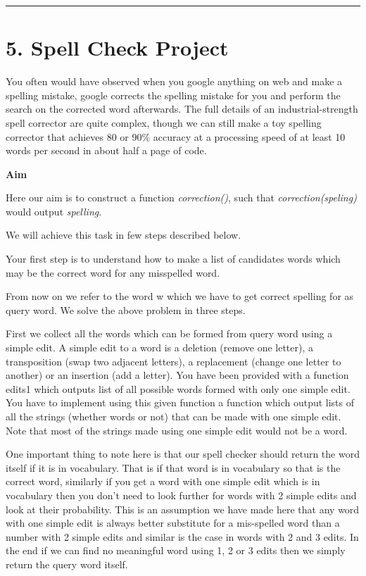 \documentclass[11pt]{article}
\begin{document}
    \begin{center}\rule{0.5\linewidth}{\linethickness}\end{center}

    \hypertarget{spell-check-project}{%
\section{5. Spell Check Project}\label{spell-check-project}}

    You often would have observed when you google anything on web and make a
spelling mistake, google corrects the spelling mistake for you and
perform the search on the corrected word afterwards. The full details of
an industrial-strength spell corrector are quite complex, though we can
still make a toy spelling corrector that achieves 80 or 90\% accuracy at
a processing speed of at least 10 words per second in about half a page
of code.

\textbf{Aim}

Here our aim is to construct a function \emph{correction()}, such that
\emph{correction(speling)} would output \emph{spelling}.

We will achieve this task in few steps described below.

Your first step is to understand how to make a list of candidates words
which may be the correct word for any misspelled word.

From now on we refer to the word w which we have to get correct spelling
for as query word. We solve the above problem in three steps.

First we collect all the words which can be formed from query word using
a simple edit. A simple edit to a word is a deletion (remove one
letter), a transposition (swap two adjacent letters), a replacement
(change one letter to another) or an insertion (add a letter). You have
been provided with a function edits1 which outputs list of all possible
words formed with only one simple edit. You have to implement using this
given function a function which output lists of all the strings (whether
words or not) that can be made with one simple edit. Note that most of
the strings made using one simple edit would not be a word.

One important thing to note here is that our spell checker should return
the word itself if it is in vocabulary. That is if that word is in
vocabulary so that is the correct word, similarly if you get a word with
one simple edit which is in vocabulary then you don't need to look
further for words with 2 simple edits and look at their probability.
This is an assumption we have made here that any word with one simple
edit is always better substitute for a mis-spelled word than a number
with 2 simple edits and similar is the case in words with 2 and 3 edits.
In the end if we can find no meaningful word using 1, 2 or 3 edits then
we simply return the query word itself.
\end{document}
